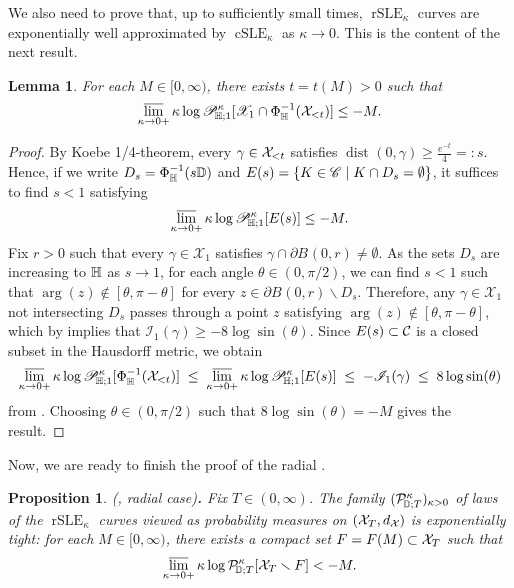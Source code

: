 \documentclass[a4paper, 11pt]{article}
\newtheorem{lem}[thm]{Lemma}
\newtheorem{prop}[thm]{Proposition}
\theoremstyle{definition}
\numberwithin{equation}{section}
\numberwithin{figure}{section}
\renewcommand{\limsup}{\varlimsup}
\newcommand{\rSLE}[1][]{\operatorname{rSLE}_{#1}}
\newcommand{\cSLE}[1][]{\operatorname{cSLE}_{#1}}
\newcommand{\cenergy}[1][]{{\mathscr I}_{#1}}
\newcommand{\Dpaths}[1][]{\cX_{#1}}
\newcommand{\Hpaths}[1][]{\mathscr{X}_{#1}} %
\newcommand{\Bmetric}[3][]{B_{#1}(#2,#3)}%
\newcommand{\dDpaths}[1][]{d_{\Dpaths[#1]}}
\renewcommand{\dist}[1][]{\operatorname{dist}_{#1}}
\newcommand{\rDmeasure}[2][]{\mathcal{P}^{#2}_{\!\bD;#1}}
\newcommand{\cHmeasure}[2][]{\mathscr{P}^{#2}_{\!\bH;#1}}
\newcommand{\cond}{\;|\;}
\begin{document}
We also need to prove that, up to sufficiently small times, 
$\rSLE[\kappa]$ curves are exponentially well approximated by $\cSLE[\kappa]$ as $\kappa \to 0$. This is the content of the next result. 

\begin{lem}\label{thm:chordal-crad-probability}
For each $M \in [0,\infty)$, there exists $t = t(M) > 0$ such that
\begin{align*}
\limsup_{\kappa \to 0+}\kappa\log\cHmeasure[1]{\kappa}[\Hpaths[1] \cap \Phi_\bH^{-1}(\Dpaths[<t])] \le -M .
\end{align*}
\end{lem}

\begin{proof}
By Koebe 1/4-theorem, every $\gamma \in \Dpaths[<t]$ satisfies 
$\dist(0, \gamma) \ge \frac{e^{-t}}{4} =: s$. 
Hence, if we write $D_s = \Phi_{\mathbb{H}}^{-1}(s\mathbb{D})$ and $E(s) = \{K \in \Hcompsets \cond K \cap D_s = \emptyset\}$, it suffices to find $s < 1$ satisfying
\begin{align*}
\limsup_{\kappa \to 0+}\kappa\log\cHmeasure[1]{\kappa}[E(s)] \le -M.
\end{align*}
Fix $r>0$ such that every $\gamma \in \Hpaths[1]$ satisfies $\gamma \cap \partial \Bmetric{0}{r} \ne \emptyset$. 
As the sets $D_s$ are increasing to $\mathbb{H}$ as $s \to 1$, 
for each angle $\theta \in (0,\pi/2)$, we can find $s < 1$ such that $\arg(z) \notin [\theta, \pi-\theta]$ for every $z \in \partial\Bmetric{0}{r} \smallsetminus D_s$. Therefore, any $\gamma \in \Hpaths[1]$ not intersecting $D_s$ passes through a point $z$ satisfying $\arg(z) \notin [\theta, \pi-\theta]$, which by \cite[Proposition~3.1]{Wang:Energy_of_deterministic_Loewner_chain} implies that $\cenergy[1](\gamma) \ge -8\log\sin(\theta)$. 
Since $E(s) \subset \mathcal{C}$ is a closed subset in the Hausdorff metric, we obtain
\begin{align*}
\limsup_{\kappa \to 0+}\kappa \log \cHmeasure[1]{\kappa}[\Phi_\bH^{-1}(\Dpaths[<t])] 
\; \le \; \limsup_{\kappa \to 0+}\kappa\log\cHmeasure[1]{\kappa}[E(s)] \; \le \; - \cenergy[1](\gamma)
\; \le \; 8\log\sin(\theta) 
\end{align*} 
from . 
Choosing $\theta \in (0,\pi/2)$ such that $8\log\sin(\theta) = -M$ gives the result.
\end{proof}

Now, we are ready to finish the proof of the radial .


\begin{prop} \label{thm:exponential-tightness-radial}
\textnormal{(, radial case){\bf.}}
Fix $T \in (0,\infty)$. 
The family $(\rDmeasure[T]{\kappa})_{\kappa > 0}$ of laws of the $\rSLE[\kappa]$ curves viewed as probability measures on $(\Dpaths[T],\dDpaths)$ is exponentially tight:
for each $M \in [0,\infty)$, there exists a compact set $\compact = \compact(M) \subset \Dpaths[T]$ such that
\begin{align*}
\limsup_{\kappa \to 0+}\kappa\log\rDmeasure[T]{\kappa}[\Dpaths[T] \smallsetminus \compact] < -M.
\end{align*}
\end{prop}
\end{document}
